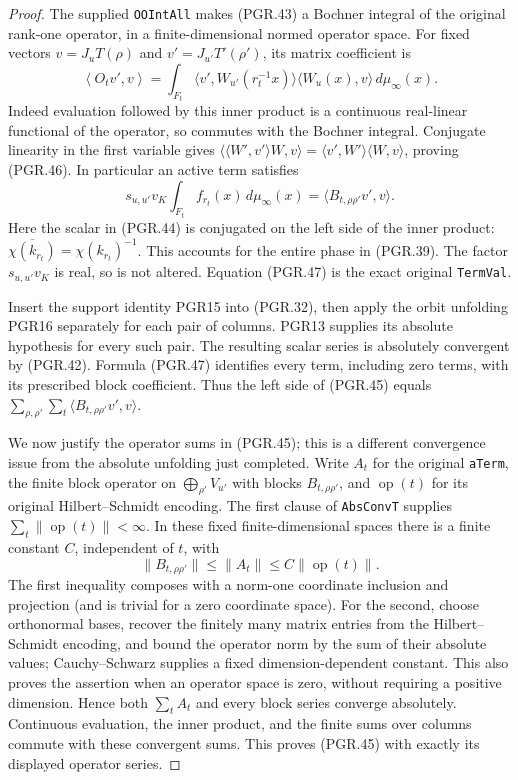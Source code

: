 \documentclass[11pt,a4paper]{article}
\numberwithin{equation}{section}
\theoremstyle{remark}\newtheorem{remark}[theorem]{Remark}
\begin{document}
\begin{proof}
The supplied \texttt{OOInt\allowbreak All} makes (PGR.43) a Bochner integral
of the original rank-one operator, in a finite-dimensional normed
operator space.  For fixed vectors \(v=J_uT(\rho)\) and
\(v'=J_{u'}T'(\rho')\), its matrix coefficient is
\[
 \left\langle O_t v',v\right\rangle
  =\int_{F_t}
       \langle v',W_{u'}(r_t^{-1}x)\rangle
       \langle W_u(x),v\rangle\,d\mu_\infty(x).
\tag{PGR.46}
\]
Indeed evaluation followed by this inner product is a continuous
real-linear functional of the operator, so commutes with the
Bochner integral.  Conjugate linearity in the first variable gives
\(\langle\langle W',v'\rangle W,v\rangle
=\langle v',W'\rangle\langle W,v\rangle\), proving (PGR.46).
In particular an active term satisfies
\[
 s_{u,u'}v_K\int_{F_t}f_{r_t}(x)\,d\mu_\infty(x)
       =\langle B_{t,\rho\rho'}v',v\rangle.
\tag{PGR.47}
\]
Here the scalar in (PGR.44) is conjugated on the left side of the
inner product: \(\overline{\chi(k_{r_t})}=\chi(k_{r_t})^{-1}\).
This accounts for the entire phase in (PGR.39).  The factor
\(s_{u,u'}v_K\) is real, so is not altered.  Equation (PGR.47)
is the exact original \texttt{Term\allowbreak Val}.

Insert the support identity PGR15 into (PGR.32), then apply the
orbit unfolding PGR16 separately for each pair of columns.  PGR13
supplies its absolute hypothesis for every such pair.  The resulting
scalar series is absolutely convergent by (PGR.42).  Formula
(PGR.47) identifies every term, including zero terms, with its
prescribed block coefficient.  Thus the left side of (PGR.45) equals
\(\sum_{\rho,\rho'}\sum_t
\langle B_{t,\rho\rho'}v',v\rangle\).

We now justify the operator sums in (PGR.45); this is a different
convergence issue from the absolute unfolding just completed.  Write
\(A_t\) for the original \texttt{a\allowbreak Term}, the finite block
operator on \(\bigoplus_{\rho'}V_{u'}\) with blocks
\(B_{t,\rho\rho'}\), and \(\operatorname{op}(t)\) for its
original Hilbert--Schmidt encoding.  The first clause of
\texttt{Abs\allowbreak Conv\allowbreak T} supplies
\(\sum_t\|\operatorname{op}(t)\|<\infty\).
In these fixed finite-dimensional spaces there is a finite constant
\(C\), independent of \(t\), with
\[
 \|B_{t,\rho\rho'}\|\leq\|A_t\|
                        \leq C\|\operatorname{op}(t)\|.
\tag{PGR.48}
\]
The first inequality composes with a norm-one coordinate inclusion
and projection (and is trivial for a zero coordinate space).  For
the second, choose orthonormal bases, recover the finitely many
matrix entries from the Hilbert--Schmidt encoding, and bound the
operator norm by the sum of their absolute values; Cauchy--Schwarz
supplies a fixed dimension-dependent constant.  This also proves
the assertion when an operator space is zero, without requiring a
positive dimension.  Hence both \(\sum_tA_t\) and every block
series converge absolutely.  Continuous evaluation, the inner
product, and the finite sums over columns commute with these
convergent sums.  This proves (PGR.45) with exactly its displayed
operator series.
\end{proof}
\end{document}
